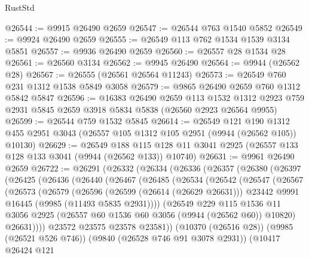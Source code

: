 \begin{lexlean}{RustStd}
\begin{coremodule}
@26544 := @9915 @26490 @2659
@26547 := @26544 @763 @1540 @5852
@26549 := @9924 @26490 @2659
@26555 := @26549 @113 @762 @1534 @1539 @3134 @5851
@26557 := @9936 @26490 @2659
@26560 := @26557 @28 @1534 @28
@26561 := @26560 @3134
@26562 := @9945 @26490
@26564 := @9944 (@26562 @28)
@26567 := @26555 (@26561 @26564 @11243)
@26573 := @26549 @760 @231 @1312 @1538 @5849 @3058
@26579 := @9865 @26490 @2659 @760 @1312 @5842 @5847
@26596 := @16383
    @26490
    @2659
    @113
    @1532
    @1312
    @2923
    @759
    @2931
    @5845
    @2659
    @3918
    @5834
    @5838
    (@26560 @2923 @26564 @9955)
@26599 := @26544 @759 @1532 @5845
@26614 := @26549
    @121
    @190
    @1312
    @455
    @2951
    @3043
    (@26557 @105 @1312 @105 @2951 (@9944 (@26562 @105)) @10130)
@26629 := @26549
    @188
    @115
    @128
    @11
    @3041
    @2925
    (@26557 @133 @128 @133 @3041 (@9944 (@26562 @133)) @10740)
@26631 := @9961 @26490 @2659
@26722 := @26291
    (@26332
      (@26334
        (@26336
          (@26357
            (@26380
              (@26397
                (@26425
                  (@26436
                    (@26440
                      (@26467
                        (@26485
                          (@26534
                            (@26542
                              (@26547
                                (@26567
                                  (@26573
                                    (@26579
                                      (@26596
                                        (@26599 (@26614 (@26629 @26631)))
                                        @23442
                                        @9991
                                        @16445
                                        (@9985 (@11493 @5835 @2931))))
                                    (@26549
                                      @229
                                      @115
                                      @1536
                                      @11
                                      @3056
                                      @2925
                                      (@26557 @60 @1536 @60 @3056 (@9944 (@26562 @60)) @10820)
                                      @26631))))
                              @23572
                              @23575
                              @23578
                              @23581))
                          (@10370 (@26516 @28))
                          (@9985 (@26521 @526 @746))
                          (@9840 (@26528 @746 @91 @3078 @2931))
                          (@10417
                            @26424
                            @121

\end{coremodule}
\end{lexlean}
